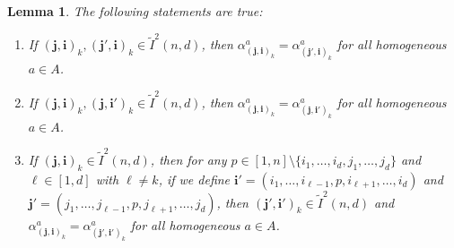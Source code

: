 \documentclass[11pt,reqno]{amsart} %
\newtheorem{lemma}[theorem]{Lemma}
\newcommand{\0}{\bar{0}}
\newcommand{\1}{\bar{1}}
\newcommand{\bi}{\mathbf{i}}
\newcommand{\bj}{\mathbf{j}}
\newcommand{\Itwo}{\tilde{I}^{2}(n,d)}
\numberwithin{equation}{subsection}
\begin{document}
\begin{lemma}  The following statements are true:
\begin{enumerate}
\item If $(\bj, \bi)_{k}, (\bj', \bi)_{k} \in \Itwo$, then $\alpha^{a}_{(\bj , \bi)_{k}}=\alpha^{a}_{(\bj' , \bi)_{k}}$ for all homogeneous $a \in A$.
\item If $(\bj, \bi)_{k}, (\bj, \bi' )_{k} \in \Itwo$, then $\alpha^{a}_{(\bj , \bi)_{k}}=\alpha^{a}_{(\bj , \bi')_{k}}$ for all homogeneous $a \in A$.
\item If $(\bj, \bi)_{k} \in \Itwo$, then for any $p \in [1,n]\setminus \{i_{1}, \dotsc , i_{d}, j_{1}, \dotsc, j_{d} \}$ and $\ell \in [1,d]$ with $\ell \neq k$, if we define $\bi '=(i_{1}, \dotsc , i_{\ell-1}, p, i_{\ell +1}, \dotsc , i_{d})$ and $\bj'=(j_{1}, \dotsc , j_{\ell-1}, p, j_{\ell +1}, \dotsc , j_{d}) $, then $(\bj', \bi' )_{k} \in \Itwo$ and $\alpha^{a}_{(\bj , \bi)_{k}}=\alpha^{a}_{(\bj' , \bi')_{k}}$ for all homogeneous $a \in A$.
\end{enumerate}
\end{lemma}
\end{document}
